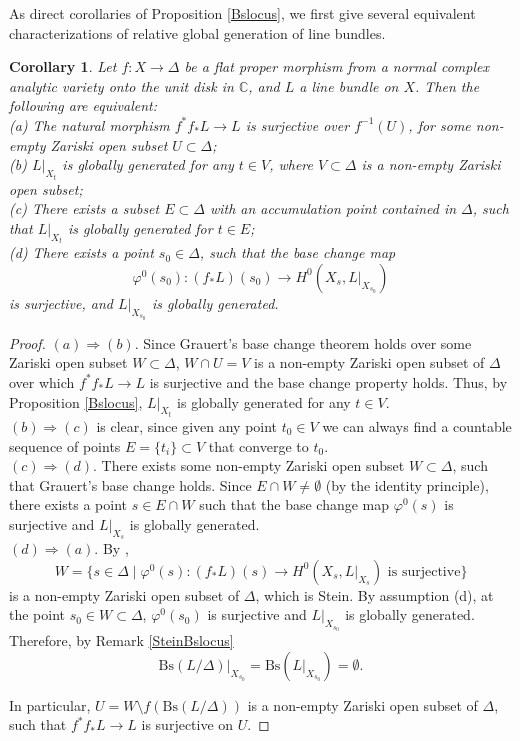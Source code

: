 \documentclass[12pt]{amsart}
\numberwithin{equation}{section}
\newtheorem{corollary}  [theorem]     {Corollary}
\theoremstyle{definition}
\theoremstyle{plain}
\newtheorem*{thm A*}{Theorem A}
\newtheorem*{thm B*}{Theorem B}
\newtheorem*{thm C*}{Theorem C}
\newtheorem*{thm D*}{Theorem D}
\theoremstyle{definition}
\renewcommand{\1}{\mathds{1}}
\renewcommand{\>}{\rightarrow}
\begin{document}
As direct corollaries of Proposition \ref{Bslocus}, we first give several equivalent characterizations of relative global generation of line bundles. 
\begin{corollary}\label{equi-rgg}
Let $f:X\to \Delta$ be a flat proper morphism from a normal complex analytic variety onto the unit disk in $\mathbb{C}$, and $L$ a line bundle on $X$. Then the following are equivalent: \\
\emph{(a)} The natural morphism $f^* f_* L \to L$ is surjective over $f^{-1}(U)$, for some non-empty Zariski open subset $U \subset \Delta$;\\
\emph{(b)} $L|_{X_t}$ is globally generated for any $t \in V$, where $V \subset \Delta$ is a non-empty Zariski open subset;\\
\emph{(c)} There exists a subset $E\subset \Delta$ with an accumulation point contained in $\Delta$, such that $L|_{X_t}$ is globally generated for $t\in E$;\\
\emph{(d)} There exists a point $s_0\in \Delta$, such that the base change map $$\varphi^0(s_0): (f_* L)(s_0)\to H^0(X_s, L|_{X_{s_0}})$$is surjective, and $L|_{X_{s_0}}$ is globally generated. 
\end{corollary}

\begin{proof}
$(a) \Rightarrow (b)$. Since Grauert's base change theorem holds over some Zariski open subset $W\subset \Delta$, $W\cap U = V $ is a non-empty Zariski open subset of $\Delta$ over which $f^*f_* L \to L$ is surjective and the base change property holds. Thus, by Proposition \ref{Bslocus}, $L|_{X_t}$ is globally generated for any $t\in V$. \\
$(b) \Rightarrow (c)$ is clear, since given any point $t_0\in V$ we can always find a countable sequence of points $E = \{t_i\}\subset V$ that converge to $t_0$. \\
$(c) \Rightarrow (d)$. There exists some non-empty Zariski open subset $W\subset \Delta$, such that Grauert's base change holds. Since $E\cap W \ne \emptyset$ (by the identity principle), there exists a point $s\in E\cap W$ such that the base change map $\varphi^0 (s)$ is surjective and $L|_{X_s}$ is globally generated.\\
$(d) \Rightarrow (a)$. By \cite[Theorem III.12.11]{Hartshorne},  
$$W = \{s\in \Delta \mid \varphi^0(s): (f_* L)(s)\to H^0(X_s, L|_{X_s}) \text{ is surjective}\}$$ 
is a non-empty Zariski open subset of $\Delta$, which is Stein. By assumption (d), at the point $s_0\in W\subset \Delta$, $\varphi^0(s_0)$ is surjective and $L|_{X_{s_0}}$ is globally generated. Therefore, by Remark \ref{SteinBslocus} 
$$\mathrm{Bs}(L/\Delta)|_{X_{s_0}} = \mathrm{Bs}(L|_{X_{s_0}}) = \emptyset.$$

In particular, $U = W \setminus f(\mathrm{Bs}(L/\Delta))$ is a non-empty Zariski open subset of $\Delta$, such that $f^*f_* L \to L$ is surjective on $U$.
\end{proof}
\end{document}
